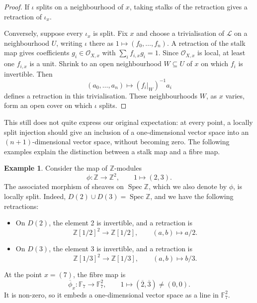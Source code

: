 \documentclass{article}
\theoremstyle{definition}
\newtheorem{example}{Example}[section]
\theoremstyle{remark}
\theoremstyle{plain}
\DeclareMathOperator{\Spec}{Spec}
\newcommand{\Z}{\mathbb{Z}}
\newcommand{\F}{\mathbb{F}}
\begin{document}
\begin{proof}
    If \(\iota\) splits on a neighbourhood of \(x\), taking stalks of the
    retraction gives a retraction of \(\iota_x\).

    Conversely, suppose every \(\iota_x\) is split. Fix \(x\) and choose
    a trivialisation of \(\mathcal{L}\) on a neighbourhood \(U\), writing
    \(\iota\) there as \(1\mapsto(f_0,\dots,f_n)\). A retraction of the
    stalk map gives coefficients \(g_i\in\mathcal{O}_{X,x}\) with
    \(\sum_i f_{i,x}g_i=1\). Since \(\mathcal{O}_{X,x}\) is local, at least
    one \(f_{i,x}\) is a unit. Shrink to an open neighbourhood
    \(W\subseteq U\) of \(x\) on which \(f_i\) is invertible. Then
    \[
        (a_0,\dots,a_n)\longmapsto (f_i|_W)^{-1}a_i
    \]
    defines a retraction in this trivialisation. These neighbourhoods
    \(W\), as \(x\) varies, form an open cover on which \(\iota\) splits.
\end{proof}

This still does not quite express our original expectation: at every
point, a locally split injection should give an inclusion of a
one-dimensional vector space into an \((n+1)\)-dimensional vector space,
without becoming zero. The following examples explain the distinction
between a stalk map and a fibre map.

\begin{example}\label{ex:lsi-23}
    Consider the map of \(\Z\)-modules
    \[
        \phi:\Z\longrightarrow\Z^2,
        \qquad 1\longmapsto(2,3).
    \]
    The associated morphism of sheaves on \(\Spec\Z\), which we also
    denote by \(\phi\), is locally split. Indeed,
    \(D(2)\cup D(3)=\Spec\Z\), and we have the following retractions:
    \begin{itemize}
        \item On \(D(2)\), the element 2 is invertible, and a retraction is
        \[
            \Z[1/2]^2\longrightarrow\Z[1/2],
            \qquad (a,b)\longmapsto a/2.
        \]
        \item On \(D(3)\), the element 3 is invertible, and a retraction is
        \[
            \Z[1/3]^2\longrightarrow\Z[1/3],
            \qquad (a,b)\longmapsto b/3.
        \]
    \end{itemize}
    At the point \(x=(7)\), the fibre map is
    \[
        \overline{\phi}_x:\F_7\longrightarrow\F_7^2,
        \qquad 1\longmapsto(\overline{2},\overline{3})\ne(0,0).
    \]
    It is non-zero, so it embeds a one-dimensional vector space as a
    line in \(\F_7^2\).
\end{example}
\end{document}
